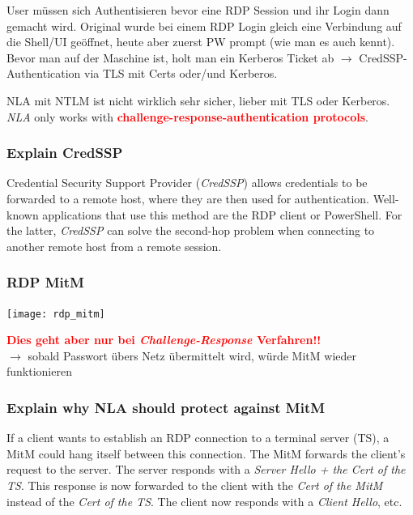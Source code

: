 User müssen sich Authentisieren bevor eine RDP Session und ihr Login dann gemacht wird.
Original wurde bei einem RDP Login gleich eine Verbindung auf die Shell/UI geöffnet, heute aber zuerst PW prompt (wie man es auch kennt).
Bevor man auf der Maschine ist, holt man ein Kerberos Ticket ab $\rightarrow$ CredSSP-Authentication via TLS mit Certs oder/und Kerberos. 

NLA mit NTLM ist nicht wirklich sehr sicher, lieber mit TLS oder Kerberos.\\

\textit{NLA} only works with \textcolor{red}{\textbf{challenge-response-authentication protocols}}.

\subsubsection{Explain CredSSP}\label{subsubsec:cred-ssp}
Credential Security Support Provider (\textit{CredSSP}) allows credentials to be forwarded to a remote host, where they are then used for authentication. Well-known applications that use this method are the RDP client or PowerShell. For the latter, \textit{CredSSP} can solve the second-hop problem when connecting to another remote host from a remote session.

\subsubsection{RDP MitM}
\begin{center}
    \texttt{[image: rdp\_mitm]}
\end{center}

\textcolor{red}{\textbf{Dies geht aber nur bei \textit{Challenge-Response} Verfahren!!}}\\
$\rightarrow$ sobald Passwort übers Netz übermittelt wird, würde MitM wieder funktionieren

\subsubsection{Explain why NLA should protect against MitM}
If a client wants to establish an RDP connection to a terminal server (TS), a MitM could hang itself between this connection. The MitM forwards the client's request to the server. The server responds with a \textit{Server Hello + the Cert of the TS}. This response is now forwarded to the client with the \textit{Cert of the MitM} instead of the \textit{Cert of the TS}. The client now responds with a \textit{Client Hello}, etc.


